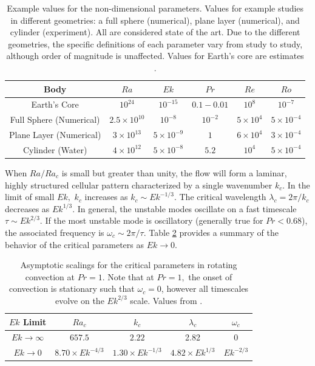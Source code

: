 	\begin{table}
		\begin{center}
		\begin{tabular}{c c c c c c}
			\hline
			\hline
			Body&$Ra$ &$Ek$ &$Pr$ &$Re$ &$Ro$\\
			\hline
			Earth's Core & $10^{24}$ &$10^{-15}$ & $0.1-0.01$ &  $10^{8}$ &$10^{-7}$\\
			Full Sphere (Numerical) & $2.5\times10^{10}$ &$10^{-8}$ & $10^{-2}$&$5\times 10^{4}$ &$5\times10^{-4}$ \\
			Plane Layer (Numerical) &$3\times 10^{13}$ &$5\times10^{-9}$&$1$&$6\times 10^{4}$ &$3\times10^{-4}$ \\
			Cylinder (Water)&$4\times 10^{12}$ & $5\times 10^{-8}$ & $5.2$&$10^{4}$ &$5\times 10^{-4}$\\
\hline
			\hline
\end{tabular}
		\end{center}
		\caption[Example values for non-dimensional parameters]{Example values for the non-dimensional parameters.
			Values for example studies in different geometries: a full sphere (numerical)\citep{cG19}, plane layer (numerical)\citep{jS24}, and cylinder (experiment)\citep{mM23}. 
		All are considered state of the art. 
		Due to the different geometries, the specific definitions of each parameter vary from study to study, although order of magnitude is unaffected.
			Values for Earth's core are estimates \citep[e.g.][]{pO13,gW98}. 
}
\label{t:nondim_geo}
	\end{table}

When $Ra/ Ra_c$ is small but greater than unity, the flow will form a laminar, highly structured cellular pattern characterized by a single wavenumber $k_{c}$. 
In the limit of small $Ek,$ $k_c$ increases as $k_c\sim Ek^{-1/3}.$ The critical wavelength $\lambda_{c} = 2\pi/k_c$ decreases as $Ek^{1/3}$.
In general, the unstable modes oscillate on a fast timescale $\tau\sim Ek^{2/3}.$ If the most unstable mode is oscillatory (generally true for $Pr<0.68$), the associated frequency is $\omega_{c}\sim 2\pi/\tau.$
Table \ref{t:asymp} provides a summary of the behavior of the critical parameters as $Ek\rightarrow 0$.

 \begin{table}
 \begin{center}
 \begin{tabular}{c c c c c}
 \hline
 \hline
 $Ek$ Limit& $Ra_c$ & $k_{c}$ &$\lambda_{c}$ & $\omega_{c}$\\
 \hline
 $Ek\rightarrow \infty$ & $657.5$ & $2.22$ & 2.82 & 0 \\
 $Ek\rightarrow 0$ & $8.70\times Ek^{-4/3}$ & $1.30\times Ek^{-1/3}$ & $4.82\times Ek^{1/3}$ & $Ek^{-2/3}$ \\
 \hline
 \hline
 \end{tabular}
 \end{center}
 \caption[Asymptotic scaling of critical parameters with $Ek$]{Asymptotic scalings for the critical parameters in rotating convection at $Pr=1$. Note that at $Pr=1,$ the onset of convection is stationary such that $\omega_{c}=0$, however all timescales evolve on the $Ek^{2/3}$ scale. Values from \citep{sC61}.} 
 \label{t:asymp}
 \end{table}


